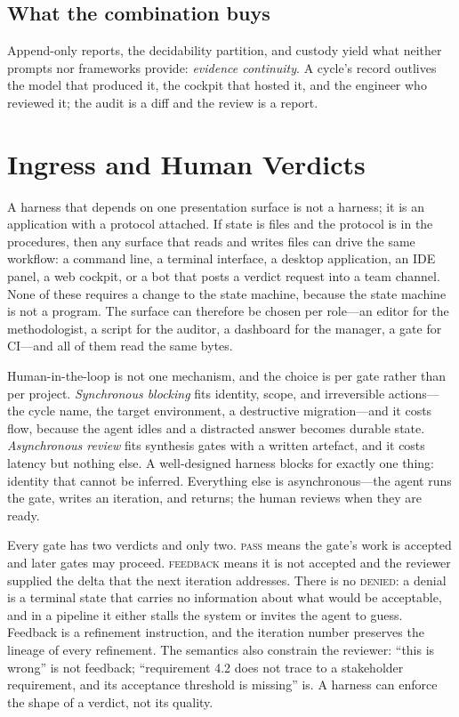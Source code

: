 \documentclass[10pt,a4paper]{article}
\theoremstyle{definition}
\theoremstyle{plain}
\theoremstyle{principle}
\begin{document}
\subsection{What the combination buys}

Append-only reports, the decidability partition, and custody yield what neither prompts nor
frameworks provide: \emph{evidence continuity}. A cycle's record outlives the model that produced
it, the cockpit that hosted it, and the engineer who reviewed it; the audit is a diff and the
review is a report.

\section{Ingress and Human Verdicts}\label{sec:hitl}

A harness that depends on one presentation surface is not a harness; it is an application with a
protocol attached. If state is files and the protocol is in the procedures, then any surface that
reads and writes files can drive the same workflow: a command line, a terminal interface, a
desktop application, an IDE panel, a web cockpit, or a bot that posts a verdict request into a team
channel. None of these requires a change to the state machine, because the state machine is not a
program. The surface can therefore be chosen per role---an editor for the methodologist, a script
for the auditor, a dashboard for the manager, a gate for CI---and all of them read the same bytes.

Human-in-the-loop is not one mechanism, and the choice is per gate rather than per project.
\emph{Synchronous blocking} fits identity, scope, and irreversible actions---the cycle name, the
target environment, a destructive migration---and it costs flow, because the agent idles and a
distracted answer becomes durable state. \emph{Asynchronous review} fits synthesis gates with a
written artefact, and it costs latency but nothing else. A well-designed harness blocks for
exactly one thing: identity that cannot be inferred. Everything else is asynchronous---the agent
runs the gate, writes an iteration, and returns; the human reviews when they are ready.

Every gate has two verdicts and only two. \textnormal{\textsc{pass}} means the gate's work is accepted and later
gates may proceed. \textnormal{\textsc{feedback}} means it is not accepted and the reviewer supplied the delta
that the next iteration addresses. There is no \textnormal{\textsc{denied}}: a denial is a terminal state that
carries no information about what would be acceptable, and in a pipeline it either stalls the
system or invites the agent to guess. Feedback is a refinement instruction, and the iteration
number preserves the lineage of every refinement. The semantics also constrain the reviewer:
``this is wrong'' is not feedback; ``requirement 4.2 does not trace to a stakeholder requirement,
and its acceptance threshold is missing'' is. A harness can enforce the shape of a verdict, not its
quality.
\end{document}
